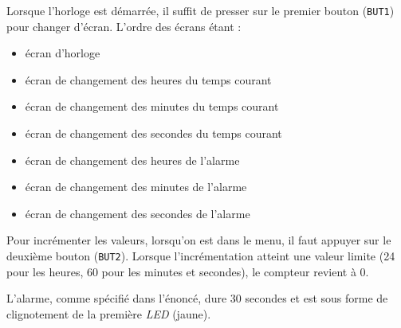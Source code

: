 
Lorsque l'horloge est démarrée, il suffit de presser sur le premier bouton (\texttt{BUT1}) pour changer d'écran. L'ordre des écrans étant :

\begin{itemize}
	\item écran d'horloge
	\item écran de changement des heures du temps courant
	\item écran de changement des minutes du temps courant
	\item écran de changement des secondes du temps courant
	\item écran de changement des heures de l'alarme
	\item écran de changement des minutes de l'alarme
	\item écran de changement des secondes de l'alarme
\end{itemize}

Pour incrémenter les valeurs, lorsqu'on est dans le menu, il faut appuyer sur le deuxième bouton (\texttt{BUT2}). Lorsque l'incrémentation atteint une valeur limite (24 pour les heures, 60 pour les minutes et secondes), le compteur revient à 0.

L'alarme, comme spécifié dans l'énoncé, dure 30 secondes et est sous forme de clignotement de la première \textit{LED} (jaune). 
